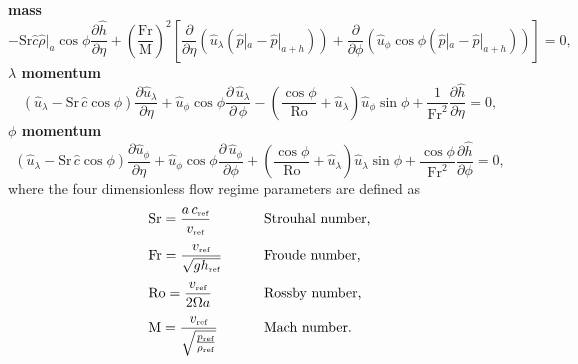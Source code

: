{\bfseries mass}
\begin{equation}
-\mathrm{Sr}\hat{c} \hat{\rho}|_{a} \cos\phi \frac{\partial \hat{h}}{\partial \eta}+\left( \frac{\mbox{Fr}}{\mbox{M}}\right)^2 \left[\frac{\partial}{\partial \eta} \left(\hat{u}_{\scriptscriptstyle \lambda}\left( \hat{p}|_a-\hat{p}|_{a+h}\right) \right) +\frac{\partial}{\partial \phi} \left(\hat{u}_{\scriptscriptstyle \phi}\cos\phi\left( \hat{p}|_a-\hat{p}|_{a+h}\right) \right)\right] =0, \label{eq:masscom2non}
\end{equation}
{\bfseries \boldmath$\lambda$ momentum}
\begin{equation}
\left(\hat{u}_{\scriptscriptstyle \lambda}-\mathrm{Sr}\,\hat{c}\cos\phi\right)\frac{\partial \hat{u}_{\scriptscriptstyle \lambda}}{\partial \eta} + \hat{u}_{\scriptscriptstyle \phi}\cos\phi\frac{\partial \, \hat{u}_{\scriptscriptstyle \lambda}}{\partial \, \phi} - \left(\frac{\cos\phi}{\mathrm{Ro}} + \hat{u}_{\scriptscriptstyle \lambda}\right)\hat{u}_{\scriptscriptstyle \phi}\sin\phi + \frac{1}{\mathrm{Fr}^2}\frac{\partial \hat{h}}{\partial \eta} = 0, \label{eq:lamcom2non}
\end{equation}
{\bfseries \boldmath$\phi$ momentum}
\begin{equation}
\left(\hat{u}_{\scriptscriptstyle \lambda}-\mathrm{Sr}\,\hat{c}\cos\phi\right)\frac{\partial \hat{u}_{\scriptscriptstyle \phi}}{\partial \eta} + \hat{u}_{\scriptscriptstyle \phi}\cos\phi\frac{\partial \, \hat{u}_{\scriptscriptstyle \phi}}{\partial \phi} + \left(\frac{\cos\phi}{\mathrm{Ro}} + \hat{u}_{\scriptscriptstyle \lambda} \right)\hat{u}_{\scriptscriptstyle \lambda}\sin\phi + \frac{\cos\phi}{\mathrm{Fr}^2}\frac{\partial \hat{h}}{\partial \phi} = 0, \label{eq:phicom2non}
\end{equation}
where the four dimensionless flow regime parameters are defined as
\begin{alignat}{2}
&\mathrm{Sr} = \displaystyle \frac{a\,c_{\mbox{\tiny ref}}}{v_{\mbox{\tiny ref}}} &\qquad& \mbox{Strouhal number,} \label{eq:comStrouhal}\\[1mm]
&\mathrm{Fr} = \displaystyle \frac{v_{\mbox{\tiny ref}}}{\sqrt{gh_{\mbox{\tiny ref}}}} && \mbox{Froude number,} \label{eq:comFroude} \\[1mm]
&\mathrm{Ro} = \displaystyle \frac{v_{\mbox{\tiny ref}}}{2\Omega a} && \mbox{Rossby number,} \label{eq:comRossby} \\[1mm]
&\mathrm{M} = \displaystyle \frac{v_{\mbox{\tiny ref}}}{\sqrt{\frac{p_{\mbox{\tiny ref}}}{\rho_{\mbox{\tiny ref}}}}} && \mbox{Mach number.} \label{eq:comMach}
\end{alignat}

